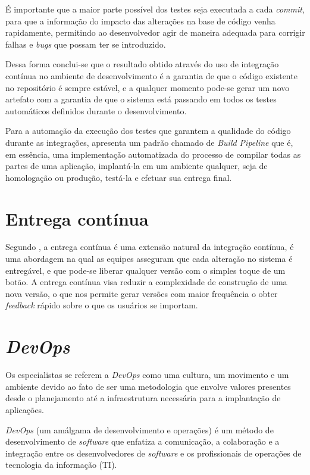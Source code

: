 \documentclass[
12pt,				%
openright,			%
oneside,			%
a4paper,			%
english,			%
french,				%
spanish,			%
brazil,				%
]{abntex2}
\begin{document}
\begin{citacao}
	É importante que a maior parte possível dos testes seja executada a cada \textit{commit}, para que a informação do impacto das alterações na base de código venha rapidamente, permitindo ao desenvolvedor agir de maneira adequada para corrigir falhas e \textit{bugs} que possam ter se introduzido.
	\cite{Caelum:ArquiteturaJava}
\end{citacao}

Dessa forma conclui-se que o resultado obtido através do uso de integração contínua no ambiente de desenvolvimento é a garantia de que o código existente no repositório é sempre estável, e a qualquer momento pode-se gerar um novo artefato com a garantia de que o sistema está passando em todos os testes automáticos definidos durante o desenvolvimento.

Para a automação da execução dos testes que garantem a qualidade do código durante as integrações,  apresenta um padrão chamado de \textit{Build Pipeline} que é, em essência, uma implementação automatizada do processo de compilar todas as partes de uma aplicação, implantá-la em um ambiente qualquer, seja de homologação ou produção, testá-la e efetuar sua entrega final.

\section{Entrega contínua}

Segundo , a entrega contínua é uma extensão natural da integração contínua, é uma abordagem na qual as equipes asseguram que cada alteração no sistema é entregável, e que pode-se liberar qualquer versão com o simples toque de um botão. A entrega contínua visa reduzir a complexidade de construção de uma nova versão, o que nos permite gerar versões com maior frequência o obter \textit{feedback} rápido sobre o que os usuários se importam.

\section{\textit{DevOps}}

Os especialistas se referem a \textit{DevOps} como uma cultura, um movimento e um ambiente devido ao fato de ser uma metodologia que envolve valores presentes desde o planejamento até a infraestrutura necessária para a implantação de aplicações.

\begin{citacao}
	\textit{DevOps} (um amálgama de desenvolvimento e operações) é um método de desenvolvimento de \textit{software} que enfatiza a comunicação, a colaboração e a integração entre os desenvolvedores de \textit{software} e os profissionais de operações de tecnologia da informação (TI).
\end{citacao}
\end{document}
